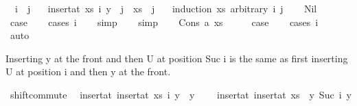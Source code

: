 \begin{isabellebody}
\ \ {\isachardoublequoteopen}i\ {\isacharless}{\kern0pt}\ j\ {\isacharequal}{\kern0pt}{\isacharequal}{\kern0pt}{\isachargreater}{\kern0pt}\isanewline
\ \ {\isacharparenleft}{\kern0pt}insert{\isacharunderscore}{\kern0pt}at\ xs\ i\ y{\isacharparenright}{\kern0pt}\ {\isacharbang}{\kern0pt}\ j\ {\isacharequal}{\kern0pt}\ xs\ {\isacharbang}{\kern0pt}\ {\isacharparenleft}{\kern0pt}j\ {\isacharminus}{\kern0pt}\ {}{\isacharparenright}{\kern0pt}{\isachardoublequoteclose}\isanewline
%
\isadelimproof
%
\endisadelimproof
%
\isatagproof
{}\isamarkupfalse%
\ {\isacharparenleft}{\kern0pt}induction\ xs\ arbitrary{\isacharcolon}{\kern0pt}\ i\ j{\isacharparenright}{\kern0pt}\isanewline
\ \ \isamarkupfalse%
\ Nil\isanewline
\ \ \isamarkupfalse%
\ \isamarkupfalse%
\ {\isacharquery}{\kern0pt}case\isanewline
\ \ \isamarkupfalse%
\ {\isacharparenleft}{\kern0pt}cases\ i{\isacharparenright}{\kern0pt}\isanewline
\ \ \isamarkupfalse%
\ simp\isanewline
\ \ \isamarkupfalse%
\ simp\isanewline
{}\isamarkupfalse%
\isanewline
\ \ \isamarkupfalse%
\ {\isacharparenleft}{\kern0pt}Cons\ a\ xs{\isacharparenright}{\kern0pt}\isanewline
\ \ \isamarkupfalse%
\ \isamarkupfalse%
\ {\isacharquery}{\kern0pt}case\isanewline
\ \ \isamarkupfalse%
\ {\isacharparenleft}{\kern0pt}cases\ i{\isacharparenright}{\kern0pt}\isanewline
\ \ \isamarkupfalse%
\ auto\isanewline
\ \ \isamarkupfalse%
\isanewline
{}\isamarkupfalse%
%
\endisatagproof
{\isafoldproof}%
%
\isadelimproof
%
\endisadelimproof
%
\begin{isamarkuptext}%
Inserting y at the front and then U at position Suc i is the same as
first inserting U at position i and then y at the front.%
\end{isamarkuptext}\isamarkuptrue%
\isamarkupfalse%
\ shift{\isacharunderscore}{\kern0pt}commute{\isacharcolon}{\kern0pt}\isanewline
\ \ {\isachardoublequoteopen}insert{\isacharunderscore}{\kern0pt}at\ {\isacharparenleft}{\kern0pt}insert{\isacharunderscore}{\kern0pt}at\ xs\ i\ y{}{\isacharparenright}{\kern0pt}\ {}\ y{}\isanewline
\ \ \ {\isacharequal}{\kern0pt}\ insert{\isacharunderscore}{\kern0pt}at\ {\isacharparenleft}{\kern0pt}insert{\isacharunderscore}{\kern0pt}at\ xs\ {}\ y{}{\isacharparenright}{\kern0pt}\ {\isacharparenleft}{\kern0pt}Suc\ i{\isacharparenright}{\kern0pt}\ y{}{\isachardoublequoteclose}\isanewline

\end{isabellebody}
